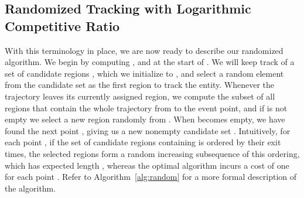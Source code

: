 \documentclass[runningheads]{llncs}
\begin{document}
    \subsection {Randomized Tracking with Logarithmic Competitive Ratio}
      With this terminology in place, we are now ready to describe our randomized algorithm.
      We begin by computing ,  and  at the start of . 
      We will keep track of a set of candidate regions , which we initialize to , and select a random element from the candidate set as the first region to track the entity.      
      Whenever the trajectory leaves its currently assigned region, we compute the subset  of all regions that contain the whole
      trajectory from  to the event point, and if  is not empty
      we select a new region randomly from .
      When  becomes empty, we have found the next point , giving us a new nonempty candidate set . Intuitively, for each point , if the set of candidate regions containing  is ordered by their exit times, the selected regions form a random increasing subsequence of this ordering, which has expected length , whereas the optimal algorithm incurs a cost of one for each point .
      Refer to Algorithm~\ref {alg:random} for a more formal description of the algorithm.
      
\end{document}
